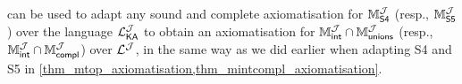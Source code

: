  can be used to adapt any sound and
complete axiomatisation for $\MsfourJ$ (resp., $\MsfiveJ$) over
the language $\cLKAJ$ to obtain an axiomatisation for $\MintJ \cap
\MunionsJ$ (resp., $\MintJ \cap \McomplJ$) over $\cLJ$, in the
same way as we did earlier when adapting S4 and S5 in
\cref{thm_mtop_axiomatisation,thm_mintcompl_axiomatisation}.







